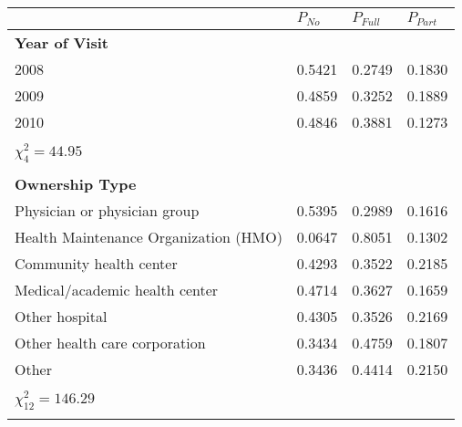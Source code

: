 \documentclass[11pt, oneside]{article}        %
\begin{document}
\begin{longtable}[h]
\footnotesize 
\centering
\caption{Descriptive Statistics (Nominal / Ordinal Variables)}

\label{tab:desc1}

\begin{tabular}{llll}
\hline \hline
                                       & $P_{No}$ & $P_{Full}$ & $P_{Part}$ \\ \hline
\textbf{Year of Visit}                 &          &            &            \\
2008                                   & 0.5421   & 0.2749     & 0.1830     \\
2009                                   & 0.4859   & 0.3252     & 0.1889     \\
2010                                   & 0.4846   & 0.3881     & 0.1273     \\
                                       &          &            &            \\
$\chi^2_4 = 44.95$                     &          &            &            \\
                                       &          &            &            \\
\textbf{Ownership Type}                &          &            &            \\
Physician or physician group           & 0.5395   & 0.2989     & 0.1616     \\
Health Maintenance Organization (HMO)  & 0.0647   & 0.8051     & 0.1302     \\
Community health center                & 0.4293   & 0.3522     & 0.2185     \\
Medical/academic health center         & 0.4714   & 0.3627     & 0.1659     \\
Other hospital                         & 0.4305   & 0.3526     & 0.2169     \\
Other health care corporation          & 0.3434   & 0.4759     & 0.1807     \\
Other                                  & 0.3436   & 0.4414     & 0.2150     \\
                                       &          &            &            \\
$\chi^2_{12} = 146.29$                 &          &            &            \\
                                       &          &            &            \\

\end{tabular}
\end{longtable}
\end{document}
